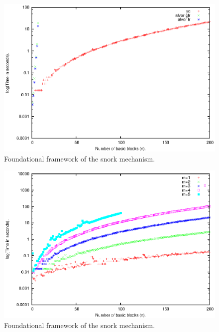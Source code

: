 \documentclass{sigplanconf}
\begin{document}
\begin{figure}
    \begin{center}
        \includegraphics[scale=0.65]{Graphics/m3.eps}
    \end{center}
    \caption{Foundational framework of the snork mechanism.}
    \label{fig-ffsm}
\end{figure}

\begin{figure}
    \begin{center}
        \includegraphics[scale=0.65]{Graphics/yc.eps}
    \end{center}
    \caption{Foundational framework of the snork mechanism.}
    \label{fig-ffsm}
\end{figure}
\end{document}

